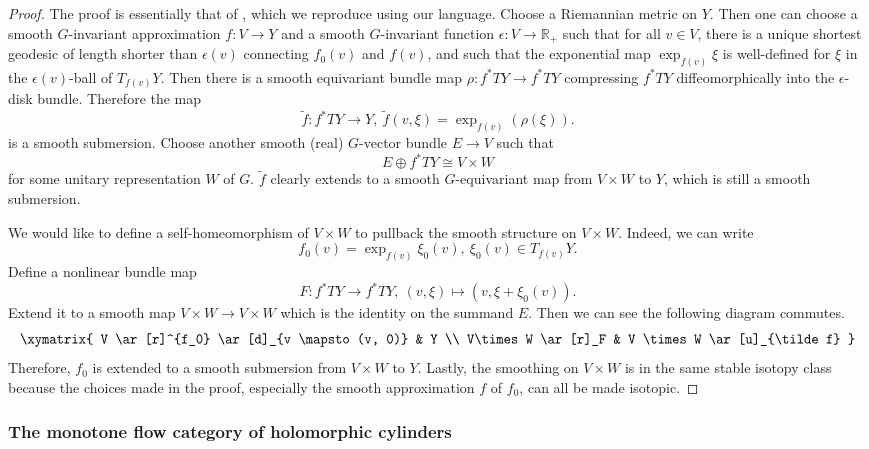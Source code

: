 \documentclass[reqno, 10pt]{amsart}
\numberwithin{equation}{section}
\numberwithin{equation}{section}
\theoremstyle{definition}
\theoremstyle{remark}
\newcommand{\beqn}{\begin{equation*}}
\newcommand{\eeqn}{\end{equation*}}
\newcommand{\mb}{\mathbb}
\begin{document}
\begin{proof}
The proof is essentially that of \cite[Lemma 4.5]{AMS}, which we reproduce using our language. Choose a Riemannian metric on $Y$. %
Then one can choose a smooth $G$-invariant approximation $f: V \to Y$ and a smooth $G$-invariant function $\epsilon: V \to {\mb R}_+$ such that for all $v \in V$, there is a unique shortest geodesic of length shorter than $\epsilon(v)$ connecting $f_0 (v)$ and $f (v)$, and such that the exponential map $\exp_{f(v)} \xi$ is well-defined for $\xi$ in the $\epsilon(v)$-ball of $T_{f(v)} Y$. Then there is a smooth equivariant bundle map $\rho: f^* TY \to f^* TY$ compressing $f^* TY$ diffeomorphically into the $\epsilon$-disk bundle. Therefore the map 
\beqn
\tilde f: f^* TY \to Y,\ \tilde f(v, \xi) = \exp_{f(v)} ( \rho(\xi)).
\eeqn
is a smooth submersion. Choose another smooth (real) $G$-vector bundle $E \to V$ such that 
\beqn
E \oplus f^* TY \cong V \times W
\eeqn
for some unitary representation $W$ of $G$. $\tilde f$ clearly extends to a smooth $G$-equivariant map from $V\times W$ to $Y$, which is still a smooth submersion.

We would like to define a self-homeomorphism of $V \times W$ to pullback the smooth structure on $V \times W$. Indeed, we can write\beqn
f_0 (v) = \exp_{f (v)} \xi_0 (v),\ \xi_0 (v) \in T_{f(v)} Y.
\eeqn
Define a nonlinear bundle map
\beqn
F: f^* TY \to f^* TY,\ (v, \xi) \mapsto (v, \xi + \xi_0(v)).
\eeqn
Extend it to a smooth map $V \times W \to V \times W$ which is the identity on the summand $E$. Then we can see the following diagram commutes.
\beqn
\xymatrix{    V \ar[r]^{f_0} \ar[d]_{v \mapsto (v, 0)} & Y \\
            V\times W \ar[r]_F  & V \times W  \ar[u]_{\tilde f} }
\eeqn
Therefore, $f_0$ is extended to a smooth submersion from $V \times W$ to $Y$. Lastly, the smoothing on $V \times W$ is in the same stable isotopy class because the choices made in the proof, especially the smooth approximation $f$ of $f_0$, can all be made isotopic.
\end{proof}












\subsubsection{The monotone flow category of holomorphic cylinders}
\end{document}
